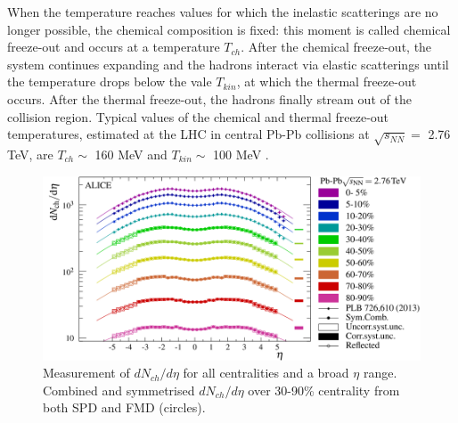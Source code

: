 When the temperature reaches values for which the inelastic scatterings are no longer possible, the chemical composition is fixed: this moment is called chemical freeze-out and occurs at a temperature $T_{ch}$. After the chemical freeze-out, the system continues expanding and the hadrons interact via elastic scatterings until the temperature drops below the vale $T_{kin}$, at which the thermal freeze-out occurs. After the thermal freeze-out, the hadrons finally stream out of the collision region. Typical values of the chemical and thermal freeze-out temperatures, estimated at the LHC in central Pb-Pb collisions at $\sqrt{s_{NN}} =$ 2.76 TeV, are $T_{ch}\sim$ 160 MeV and $T_{kin}\sim$ 100 MeV \cite{temp}.
%
\begin{figure}
  \centering
  \includegraphics[scale=0.4]{figures/dNdeta.png}
  \caption{Measurement of $dN_{ch}/d\eta$ for all centralities and a broad $\eta$ range. Combined and symmetrised $dN_{ch}/d\eta$ over 30-90\% centrality from both SPD and FMD (circles)\cite{dndeta}.}
  \label{fig:dndeta}
\end{figure}
%
%
